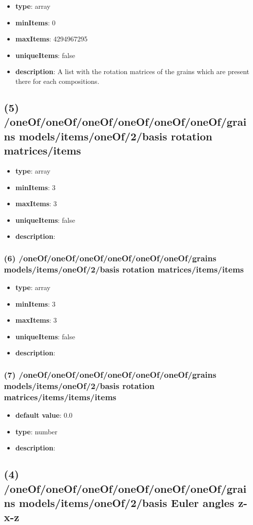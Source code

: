 \begin{itemize}[leftmargin=4em]\item {\bf type}: array
\item {\bf minItems}: 0
\item {\bf maxItems}: 4294967295
\item {\bf uniqueItems}: false
\item {\bf description}: A list with the rotation matrices of the grains which are present there for each compositions.
\end{itemize}\subsection{(5) /oneOf/oneOf/oneOf/oneOf/oneOf/oneOf/grains models/items/oneOf/2/basis rotation matrices/items}
\begin{itemize}[leftmargin=5em]\item {\bf type}: array
\item {\bf minItems}: 3
\item {\bf maxItems}: 3
\item {\bf uniqueItems}: false
\item {\bf description}: 
\end{itemize}\subsubsection{(6) /oneOf/oneOf/oneOf/oneOf/oneOf/oneOf/grains models/items/oneOf/2/basis rotation matrices/items/items}
\begin{itemize}[leftmargin=6em]\item {\bf type}: array
\item {\bf minItems}: 3
\item {\bf maxItems}: 3
\item {\bf uniqueItems}: false
\item {\bf description}: 
\end{itemize}\subsubsection{(7) /oneOf/oneOf/oneOf/oneOf/oneOf/oneOf/grains models/items/oneOf/2/basis rotation matrices/items/items/items}
\begin{itemize}[leftmargin=7em]\item {\bf default value}: 0.0
\item {\bf type}: number
\item {\bf description}: 
\end{itemize}\subsection{(4) /oneOf/oneOf/oneOf/oneOf/oneOf/oneOf/grains models/items/oneOf/2/basis Euler angles z-x-z}
